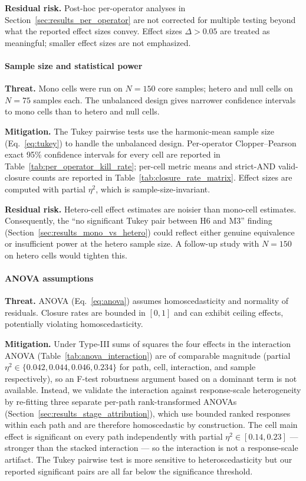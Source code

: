 \textbf{Residual risk.} Post-hoc per-operator analyses in Section~\ref{sec:results_per_operator} are not corrected for multiple testing beyond what the reported effect sizes convey. Effect sizes $\Delta > 0.05$ are treated as meaningful; smaller effect sizes are not emphasized.

\paragraph{Sample size and statistical power}

\textbf{Threat.} Mono cells were run on $N = 150$ core samples; hetero and null cells on $N = 75$ samples each. The unbalanced design gives narrower confidence intervals to mono cells than to hetero and null cells.

\textbf{Mitigation.} The Tukey pairwise tests use the harmonic-mean sample size (Eq.~\ref{eq:tukey}) to handle the unbalanced design. Per-operator Clopper--Pearson exact 95\% confidence intervals for every cell are reported in Table~\ref{tab:per_operator_kill_rate}; per-cell metric means and strict-AND valid-closure counts are reported in Table~\ref{tab:closure_rate_matrix}. Effect sizes are computed with partial $\eta^2$, which is sample-size-invariant.

\textbf{Residual risk.} Hetero-cell effect estimates are noisier than mono-cell estimates. Consequently, the ``no significant Tukey pair between H6 and M3'' finding (Section~\ref{sec:results_mono_vs_hetero}) could reflect either genuine equivalence or insufficient power at the hetero sample size. A follow-up study with $N = 150$ on hetero cells would tighten this.

\paragraph{ANOVA assumptions}

\textbf{Threat.} ANOVA (Eq.~\ref{eq:anova}) assumes homoscedasticity and normality of residuals. Closure rates are bounded in $[0, 1]$ and can exhibit ceiling effects, potentially violating homoscedasticity.

\textbf{Mitigation.} Under Type-III sums of squares the four effects in the interaction ANOVA (Table~\ref{tab:anova_interaction}) are of comparable magnitude (partial $\eta^2 \in \{0.042, 0.044, 0.046, 0.234\}$ for path, cell, interaction, and sample respectively), so an F-test robustness argument based on a dominant term is not available. Instead, we validate the interaction against response-scale heterogeneity by re-fitting three separate per-path rank-transformed ANOVAs (Section~\ref{sec:results_stage_attribution}), which use bounded ranked responses within each path and are therefore homoscedastic by construction. The cell main effect is significant on every path independently with partial $\eta^2 \in [0.14, 0.23]$ --- stronger than the stacked interaction --- so the interaction is not a response-scale artifact. The Tukey pairwise test is more sensitive to heteroscedasticity but our reported significant pairs are all far below the significance threshold.

